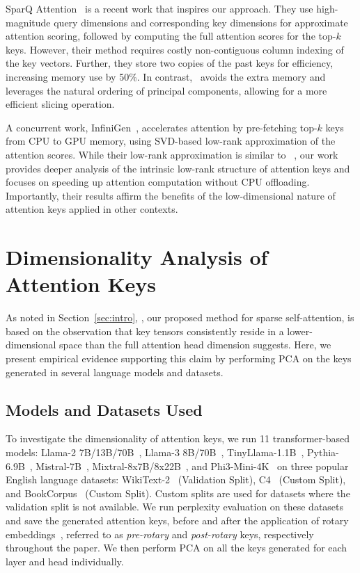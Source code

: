 SparQ Attention~\citep{ribar2023sparq} is a recent work that inspires our
approach. They use high-magnitude query dimensions and corresponding key
dimensions for approximate attention scoring, followed by computing the full
attention scores for the top-$k$ keys. However, their method requires costly
non-contiguous column indexing of the key vectors. Further, they store two
copies of the past keys for efficiency, increasing memory use by 50\%. In
contrast, \method~avoids the extra memory and leverages the natural ordering of
principal components, allowing for a more efficient slicing operation.

A concurrent work, InfiniGen~\citep{lee2024infinigen}, accelerates attention by
pre-fetching top-$k$ keys from CPU to GPU memory, using SVD-based low-rank
approximation of the attention scores. While their low-rank approximation is
similar to ~\method, our work provides deeper analysis of the intrinsic
low-rank structure of attention keys and focuses on speeding up attention
computation without CPU offloading. Importantly, their results affirm the
benefits of the low-dimensional nature of attention keys applied in other
contexts.

\section{Dimensionality Analysis of Attention Keys}
\label{sec:dimanalysis}
As noted in Section~\ref{sec:intro}, \method, our proposed method for
sparse self-attention, is based on the observation that key tensors
consistently reside in a lower-dimensional space than the full attention head
dimension suggests. Here, we present empirical evidence supporting this claim
by performing PCA on the keys generated in several language models and
datasets. 

\subsection{Models and Datasets Used}

To investigate the dimensionality of attention keys, we run 11
transformer-based models: Llama-2 7B/13B/70B~\citep{touvron2023llama}, Llama-3
8B/70B~\citep{dubey2024llama3herdmodels},
TinyLlama-1.1B~\citep{zhang2024tinyllama},
Pythia-6.9B~\citep{biderman2023pythia}, Mistral-7B~\citep{jiang2023mistral},
Mixtral-8x7B/8x22B~\citep{jiang2024mixtral}, and
Phi3-Mini-4K~\citep{microsoft2024phi3} on three popular English language
datasets: WikiText-2~\citep{wikitext-103} (Validation Split),
C4~\citep{raffel2023exploring} (Custom Split), and
BookCorpus~\citep{zhu2015aligning} (Custom Split).  Custom splits are used for
datasets where the validation split is not available.  We run perplexity
evaluation on these datasets and save the generated attention keys, before and
after the application of rotary embeddings~\citep{su2023roformer}, referred to
as \emph{pre-rotary} and \emph{post-rotary} keys, respectively throughout the
paper. We then perform PCA on all the keys generated for each layer and head
individually. 

